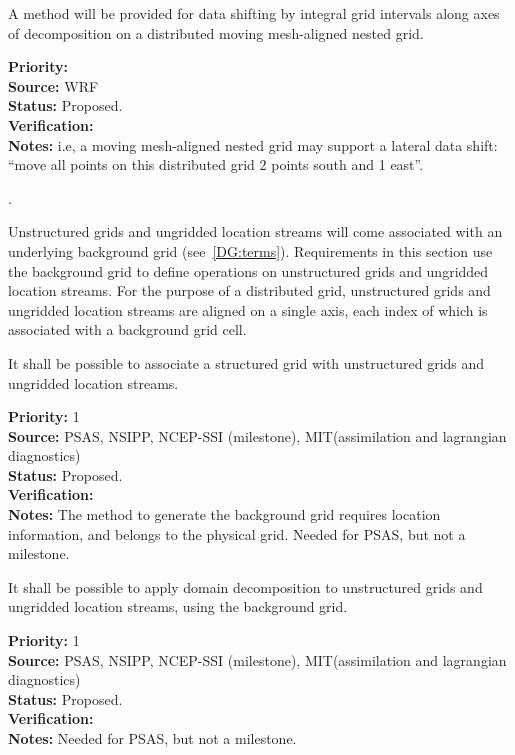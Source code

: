 A method will be provided for data shifting by integral grid intervals
along axes of decomposition on a distributed moving mesh-aligned
nested grid.

\begin{reqlist}
{\bf Priority:} \\
{\bf Source:} WRF \\
{\bf Status:} Proposed. \\
{\bf Verification:} \\
{\bf Notes:} i.e, a moving mesh-aligned nested grid may support a
  lateral data shift: ``move all points on this distributed grid 2
  points south and 1 east''.
\end{reqlist}

 \label{DG:Unstructured}.

Unstructured grids and ungridded location streams will come associated
with an underlying background grid (see~\ref{DG:terms}). Requirements
in this section use the background grid to define operations on
unstructured grids and ungridded location streams. For the purpose of
a distributed grid, unstructured grids and ungridded location streams are
aligned on a single axis, each index of which is associated with a
background grid cell.


It shall be possible to associate a structured grid with unstructured
grids and ungridded location streams.

\begin{reqlist}
{\bf Priority:} 1 \\ 
{\bf Source:} PSAS, NSIPP, NCEP-SSI (milestone), MIT(assimilation  and lagrangian diagnostics) \\
{\bf Status:} Proposed. \\
{\bf Verification:} \\
{\bf Notes:} The method to generate the background grid requires
  location information, and belongs to the physical grid.  Needed
  for PSAS, but not a milestone.
\end{reqlist}


It shall be possible to apply domain decomposition to unstructured
grids and ungridded location streams, using the background grid.

\begin{reqlist}
{\bf Priority:} 1 \\ 
{\bf Source:} PSAS, NSIPP, NCEP-SSI (milestone), MIT(assimilation  and lagrangian diagnostics) \\
{\bf Status:} Proposed. \\ 
{\bf Verification:} \\
{\bf Notes:}  Needed for PSAS, but not a milestone.
\end{reqlist}

